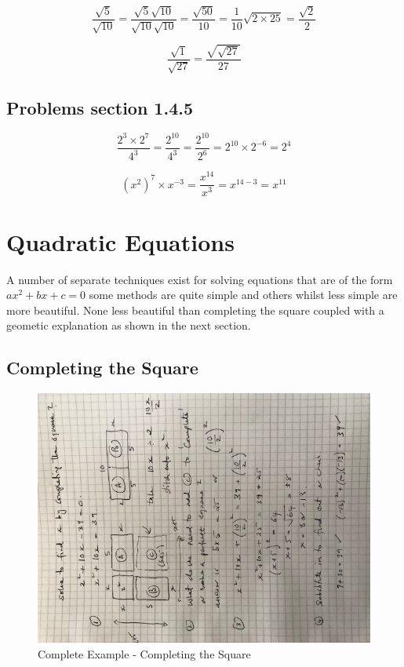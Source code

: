 \begin{equation}
  \frac{\sqrt{5}}{\sqrt{10}} = \frac{\sqrt{5} \sqrt{10}}{\sqrt{10}\sqrt{10}} = \frac{\sqrt{50}}{10} = \frac{1}{10} \sqrt{2 \times 25} = \frac{\sqrt{2}}{2}
\end{equation}

\begin{equation}
  \frac{\sqrt{1}}{\sqrt{27}} = \frac{\sqrt{\sqrt{27}}}{27}
\end{equation}

\subsection{Problems section 1.4.5}

\begin{equation}
  \frac{2^{3} \times 2^{7}}{4^{3}} = \frac{2^{10}}{4^{3}} = \frac{2^{10}}{2^{6}} = 2^{10} \times 2^{-6} = 2^{4}
\end{equation}

\begin{equation}
  (x^{2})^{7} \times x^{-3} = \frac{x^{14}}{x^{3}} = x^{14-3} = x^{11}
\end{equation}



\section{Quadratic Equations}

A number of separate techniques exist for solving equations that are of the form $ ax^{2} +bx + c = 0 $ some methods are quite simple and others whilst less simple are more beautiful. None less beautiful than completing the square coupled with a geometic explanation as shown in the next section.

\subsection{Completing the Square}


\begin{figure}[h]
    \centering
    \includegraphics[width=1.25\textwidth]{IMG_3049}
    \caption{Complete Example - Completing the Square}
    \label{fig:example1}
\end{figure}

